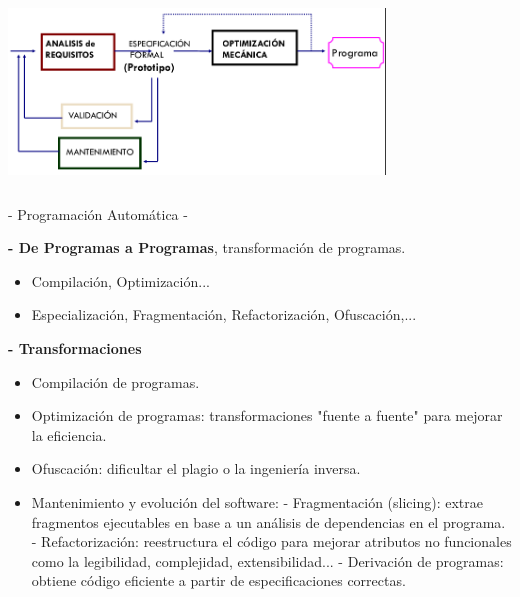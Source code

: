 \documentclass[12pt]{amsart}
\begin{document}
    \begin{center}
        \includegraphics[width=10cm, height=5cm]{t2progauto.png}
        
        - Programación Automática -
    \end{center}

    \textbf{- De Programas a Programas}, transformación de
    programas.

    \begin{itemize}
        \item \textrightarrow Compilación, Optimización...
        \item \textrightarrow Especialización, Fragmentación,
        Refactorización, Ofuscación,...
    \end{itemize}

    \textbf{- Transformaciones}

    \begin{itemize}
        \item Compilación de programas.
        \item Optimización de programas: transformaciones
        "fuente a fuente" para mejorar la eficiencia.
        \item Ofuscación: dificultar el plagio o la ingeniería
        inversa.
        \item Mantenimiento y evolución del software:
        \subitem - Fragmentación (slicing): extrae fragmentos
        ejecutables en base a un análisis de dependencias
        en el programa.
        \subitem - Refactorización: reestructura el código
        para mejorar atributos no funcionales como
        la legibilidad, complejidad, extensibilidad...
        \subitem - Derivación de programas: obtiene código
        eficiente a partir de especificaciones correctas.
    \end{itemize}
\end{document}
